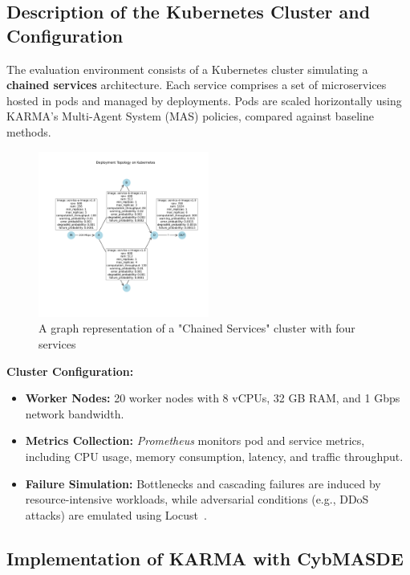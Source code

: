 \documentclass[conference]{IEEEtran}
\begin{document}
\subsection{Description of the Kubernetes Cluster and Configuration}

The evaluation environment consists of a Kubernetes cluster simulating a \textbf{chained services} architecture. Each service comprises a set of microservices hosted in pods and managed by deployments. Pods are scaled horizontally using KARMA's Multi-Agent System (MAS) policies, compared against baseline methods.

\begin{figure}[h!]
    \centering
    \hspace{-0.4cm}
    \includegraphics[trim=1.8cm 3.3cm 1.25cm 3.5cm, clip, width=0.5\textwidth]{figures/k8s_cluster_graph.pdf}
    \caption{A graph representation of a "Chained Services" cluster with four services}
    \label{fig:chained_services_graph}
\end{figure}

\textbf{Cluster Configuration:}
\begin{itemize}
    \item \textbf{Worker Nodes:} 20 worker nodes with 8 vCPUs, 32 GB RAM, and 1 Gbps network bandwidth.
    \item \textbf{Metrics Collection:} \textit{Prometheus} monitors pod and service metrics, including CPU usage, memory consumption, latency, and traffic throughput.
    \item \textbf{Failure Simulation:} Bottlenecks and cascading failures are induced by resource-intensive workloads, while adversarial conditions (e.g., DDoS attacks) are emulated using Locust~\cite{locust2021}.
\end{itemize}

\subsection{Implementation of KARMA with CybMASDE}
\end{document}
